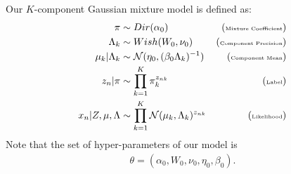 \documentclass[landscape,a0paper,fontscale=0.292]{baposter}
\newcommand{\N}{\mathcal{N}}
\begin{document}
\begin{poster}
{\begin{center}
    \end{center}
    \small{Our $K$-component Gaussian mixture model is defined as:}
\begin{align*}
\pi &\sim Dir(\alpha_0) &\tiny{(\text{Mixture Coefficient})}&\\
\Lambda_k &\sim Wish(W_0, \nu_0)& \tiny{(\text{Component Precision})}& \\
\mu_k | \Lambda_k &\sim \N(\eta_0, (\beta_0 \Lambda_k )^{-1}) &\tiny{(\text{Component Mean})}&\\
z_n | \pi &\sim \prod_{k=1}^K \pi_k^{z_{nk}} & \tiny{(\text{Label})}&\\
x_n | Z, \mu, \Lambda &\sim \prod_{k=1}^K \N(\mu_k, \Lambda_k)^{z_{nk}} &\tiny{(\text{Likelihood})}&
\end{align*}
Note that the set of hyper-parameters of our model is 
\begin{align*}
\theta = (\alpha_0, W_0, \nu_0, \eta_0, \beta_0).
\end{align*} 
}




\end{poster}
\end{document}
